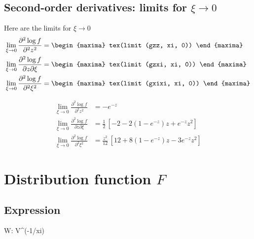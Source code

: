 \subsection{Second-order derivatives: limits for $\xi \to 0$}
Here are the limits for $\xi \to 0$
{\color{MonVertF}
  \begin{align*}
  \lim_{\xi \to 0} \frac{\partial^2 \log f}{\partial^2 z^2}
  &=
    \begin{maxima}
      tex(limit (gzz, xi, 0))
    \end{maxima}
  \\
  \lim_{\xi \to 0} \frac{\partial^2 \log f}{\partial z \partial \xi}
  &=
    \begin{maxima}
      tex(limit (gzxi, xi, 0))
    \end{maxima}
  \\
  \lim_{\xi \to 0} \frac{\partial^2 \log f}{\partial^2 \xi^2}
   &=
    \begin{maxima}
      tex(limit (gxixi, xi, 0))
    \end{maxima}
\end{align*}
}

{\color{red}
\begin{align*}
  \lim_{\xi \to 0} \frac{\partial^2 \log f}{\partial^2 z^2}
  &= -e^{-z}
  \\
  \lim_{\xi \to 0} \frac{\partial^2 \log f}{\partial z \partial \xi}
  &= \frac{1}{2} \, \left[ -2  - 2 (1 - e^{-z}) z  + e^{-z} z^2\right]  
  \\
  \lim_{\xi \to 0} \frac{\partial^2 \log f}{\partial^2 \xi^2}
   &=
    \frac{z^2}{12} \, \left[12 + 8 (1 - e^{-z}) z -3 e^{-z} z^2 \right]
\end{align*}}

\section{Distribution function $F$}

\subsection{Expression}

\begin{maxima}
  W: V^(-1/xi)
\end{maxima}

